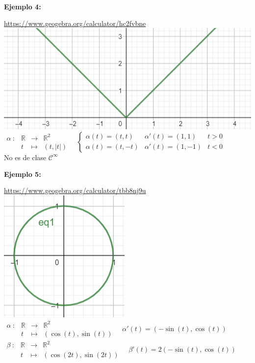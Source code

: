 \documentclass{article}
\begin{document}
\textbf{Ejemplo 4:}
\begin{center}
    \url{https://www.geogebra.org/calculator/hc2fvbne}\\
    \includegraphics[scale=0.5]{figuras/ejemplos 1/ejemplo 4.PNG}\\
    $\begin{array}{cccl}
    \alpha\::&\mathbb{R}&\longrightarrow&\mathbb{R}^2\\
        &t&\longmapsto&(t,|t|)
\end{array} \quad \left\{\begin{array}{lll}
    \alpha(t)=(t,t) & \alpha'(t)=(1,1) & t>0 \\
    \alpha(t)=(t,-t) & \alpha'(t)=(1,-1) & t<0
\end{array}\right.$\\
No es de clase $\mathcal{C}^\infty$
\end{center}
\textbf{Ejemplo 5:}
\begin{center}
    \url{https://www.geogebra.org/calculator/tbb8nj9u}\\
    \includegraphics[scale=0.5]{figuras/ejemplos 1/ejemplo circulo.PNG}\\
    $\begin{array}{cccl}
    \alpha\::&\mathbb{R}&\longrightarrow&\mathbb{R}^2\\
        &t&\longmapsto&(\cos(t),\sin(t))
\end{array} \quad \alpha'(t)=(-\sin(t),\cos(t))$\\
    $\begin{array}{cccl}
    \beta\::&\mathbb{R}&\longrightarrow&\mathbb{R}^2\\
        &t&\longmapsto&(\cos(2t),\sin(2t))
\end{array} \quad \beta'(t)=2(-\sin(t),\cos(t))$
\end{center}
\end{document}
